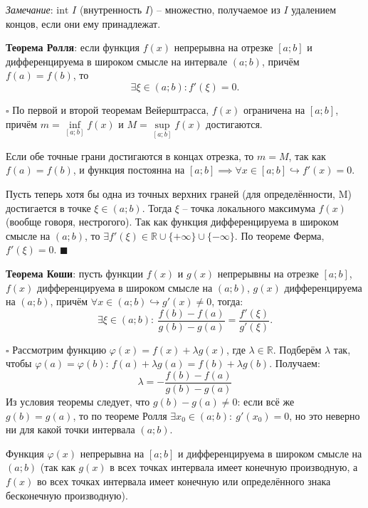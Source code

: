 \documentclass[12pt, a4paper, reqno]{article}
\begin{document}
    \textit{Замечание}: $\text{int }I$ (внутренность $I$) -- множестно, получаемое из $I$ удалением
    концов, если они ему принадлежат.

    \textbf{Теорема Ролля}: если функция $f(x)$ непрерывна на отрезке $[a; b]$ и дифференцируема в
    широком смысле на интервале $(a; b)$, причём $f(a) = f(b)$, то
    \begin{equation*}
        \exists\xi\in(a; b): f'(\xi) = 0.
    \end{equation*}

    $\square$ По первой и второй теоремам Вейерштрасса, $f(x)$ ограничена на $[a; b]$, причём
    $m = \inf\limits_{[a; b]} f(x)$ и $M = \sup\limits_{[a; b]} f(x)$ достигаются.

    Если обе точные грани достигаются в концах отрезка, то $m = M$, так как $f(a) = f(b)$, и функция
    постоянна на $[a; b] \implies \forall x\in[a; b]\hookrightarrow f'(x) = 0$.

    Пусть теперь хотя бы одна из точных верхних граней (для определённости, M) достигается в точке
    $\xi\in(a; b)$. Тогда $\xi$ -- точка локального максимума $f(x)$ (вообще говоря, нестрогого). Так
    как функция дифференцируема в широком смысле на $(a; b)$, то
    $\exists f'(\xi)\in\mathbb{R}\cup\{+\infty\}\cup\{-\infty\}$. По теореме Ферма, $f'(\xi) = 0$.
    $\blacksquare$

    \textbf{Теорема Коши}: пусть функции $f(x)$ и $g(x)$ непрерывны на отрезке $[a; b]$, $f(x)$
    дифференцируема в широком смысле на $(a; b)$, $g(x)$ дифференцируема на $(a; b)$, причём
    $\forall x\in(a; b)\hookrightarrow g'(x)\neq 0$, тогда:
    \begin{equation*}
    \exists\xi\in(a; b):\ \dfrac{f(b) - f(a)}{g(b) - g(a)} = \dfrac{f'(\xi)}{g'(\xi)}.
    \end{equation*}

    $\square$ Рассмотрим функцию $\varphi(x) = f(x) + \lambda g(x)$, где $\lambda\in\mathbb{R}$.
    Подберём $\lambda$ так, чтобы $\varphi(a) = \varphi(b)$: $f(a) + \lambda g(a) = f(b) + \lambda
    g(b)$. Получаем:
    \begin{equation*}
        \lambda = -\dfrac{f(b) - f(a)}{g(b) - g(a)}
    \end{equation*}
    Из условия теоремы следует, что $g(b) - g(a)\neq 0$: если всё же $g(b) = g(a)$, то по теореме
    Ролля $\exists x_0\in(a; b):\ g'(x_0) = 0$, но это неверно ни для какой точки интервала $(a; b)$.

    Функция $\varphi(x)$ непрерывна на $[a; b]$ и дифференцируема в широком смысле на $(a; b)$ (так
    как $g(x)$ в всех точках интервала имеет конечную производную, а $f(x)$ во всех точках интервала
    имеет конечную или определённого знака бесконечную производную).
\end{document}
